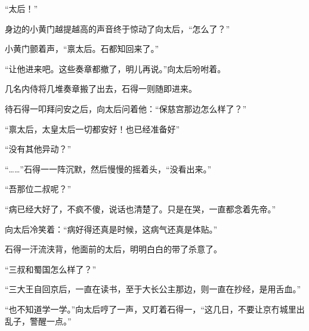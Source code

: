 “太后！”

身边的小黄门越提越高的声音终于惊动了向太后，“怎么了？”

小黄门颤着声，“禀太后。石都知回来了。”

“让他进来吧。这些奏章都撤了，明儿再说。”向太后吩咐着。

几名内侍将几堆奏章搬了出去，石得一则随即进来。

待石得一叩拜问安之后，向太后问着他：“保慈宫那边怎么样了？”

“禀太后，太皇太后一切都安好！也已经准备好”

“没有其他异动？”

“……”石得一一阵沉默，然后慢慢的摇着头，“没看出来。”

“吾那位二叔呢？”

“病已经大好了，不疯不傻，说话也清楚了。只是在哭，一直都念着先帝。”

向太后冷笑着：“病好得还真是时候，这病气还真是体贴。”

石得一汗流浃背，他面前的太后，明明白白的带了杀意了。

“三叔和蜀国怎么样了？”

“三大王自回京后，一直在读书，至于大长公主那边，则一直在抄经，是用舌血。”

“也不知道学一学。”向太后哼了一声，又盯着石得一，“这几日，不要让京冇城里出乱子，警醒一点。”

